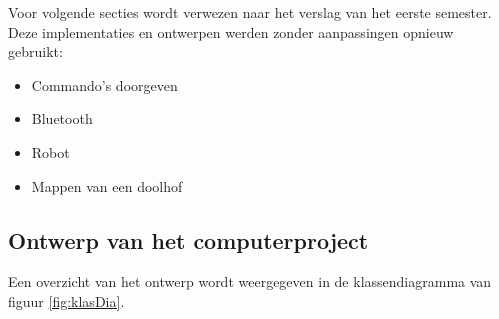 \documentclass[tt2]{penoverslag}
\begin{document}
Voor volgende secties wordt verwezen naar het verslag van het eerste semester. Deze implementaties en ontwerpen werden zonder aanpassingen opnieuw gebruikt:

\begin{itemize}
\item Commando's doorgeven
\item Bluetooth
\item Robot
\item Mappen van een doolhof
\end{itemize}

\subsection{Ontwerp van het computerproject}
\label{ssec:Sdesign}
Een overzicht van het ontwerp wordt weergegeven in de klassendiagramma van figuur \ref{fig:klasDia}.\\
\end{document}
